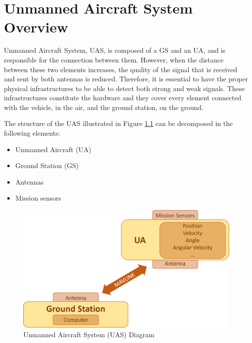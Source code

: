 \chapter{Unmanned Aircraft System Overview}\label{ch:uas}

Unmanned Aircraft System, UAS, is composed of a GS and an UA, and is responsible for the connection between them. However, when the distance between these two elements increases, the quality of the signal that is received and sent by both antennas is reduced. Therefore, it is essential to have the proper physical infrastructures to be able to detect both strong and weak signals. These infrastructures constitute the hardware and they cover every element connected with the vehicle, in the air, and the ground station, on the ground.


The structure of the UAS illustrated in Figure \ref{fig:uas} can be decomposed in the following elements:
\begin{itemize}
	\item Unmanned Aircraft (UA)
	\item Ground Station (GS)
	\item Antennas
	\item Mission sensors
\end{itemize}

\begin{figure}[H]
	\centering
	\includegraphics[scale=0.4]{figures/uas.png}
	\caption{Unmanned Aircraft System (UAS) Diagram}
	\label{fig:uas}
\end{figure}

